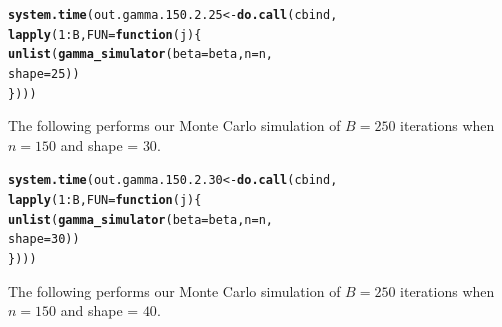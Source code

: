 \documentclass[11pt]{article}\usepackage[]{graphicx}\usepackage[]{color}
\makeatletter
\newcommand{\hlnum}[1]{\textcolor[rgb]{0.686,0.059,0.569}{#1}}%
\newcommand{\hlopt}[1]{\textcolor[rgb]{0,0,0}{#1}}%
\newcommand{\hlstd}[1]{\textcolor[rgb]{0.345,0.345,0.345}{#1}}%
\newcommand{\hlkwa}[1]{\textcolor[rgb]{0.161,0.373,0.58}{\textbf{#1}}}%
\newcommand{\hlkwb}[1]{\textcolor[rgb]{0.69,0.353,0.396}{#1}}%
\newcommand{\hlkwc}[1]{\textcolor[rgb]{0.333,0.667,0.333}{#1}}%
\newcommand{\hlkwd}[1]{\textcolor[rgb]{0.737,0.353,0.396}{\textbf{#1}}}%
\newenvironment{kframe}{%
 \def\at@end@of@kframe{}%
 \ifinner\ifhmode%
  \def\at@end@of@kframe{\end{minipage}}%
  \begin{minipage}{\columnwidth}%
 \fi\fi%
 \def\FrameCommand##1{\hskip\@totalleftmargin \hskip-\fboxsep
 \colorbox{shadecolor}{##1}\hskip-\fboxsep
     \hskip-\linewidth \hskip-\@totalleftmargin \hskip\columnwidth}%
 \MakeFramed {\advance\hsize-\width
   \@totalleftmargin\z@ \linewidth\hsize
   \@setminipage}}%
 {\par\unskip\endMakeFramed%
 \at@end@of@kframe}
\newenvironment{knitrout}{}{} %
\makeatother
\begin{document}
\begin{knitrout}
\color{fgcolor}\begin{kframe}
\begin{alltt}
\hlkwd{system.time}\hlstd{(out.gamma.150.2.25} \hlkwb{<-} \hlkwd{do.call}\hlstd{(cbind,}
  \hlkwd{lapply}\hlstd{(}\hlnum{1}\hlopt{:}\hlstd{B,} \hlkwc{FUN} \hlstd{=} \hlkwa{function}\hlstd{(}\hlkwc{j}\hlstd{)\{}
    \hlkwd{unlist}\hlstd{(}\hlkwd{gamma_simulator}\hlstd{(}\hlkwc{beta} \hlstd{= beta,} \hlkwc{n} \hlstd{= n,}
      \hlkwc{shape} \hlstd{=} \hlnum{25}\hlstd{))}
\hlstd{\})))}
\end{alltt}


{\ttfamily\noindent\bfseries\color{errorcolor}{\#\# Error in r[, l]/mad.predict.fun(out.mad, xx): non-numeric argument to binary operator}}

{\ttfamily\noindent\itshape\color{messagecolor}{\#\# Timing stopped at: 1.815 0.001 1.816}}\end{kframe}
\end{knitrout}


The following performs our Monte Carlo simulation of $B = 250$ iterations 
when $n = 150$ and shape = $30$.

\begin{knitrout}
\color{fgcolor}\begin{kframe}
\begin{alltt}
\hlkwd{system.time}\hlstd{(out.gamma.150.2.30} \hlkwb{<-} \hlkwd{do.call}\hlstd{(cbind,}
  \hlkwd{lapply}\hlstd{(}\hlnum{1}\hlopt{:}\hlstd{B,} \hlkwc{FUN} \hlstd{=} \hlkwa{function}\hlstd{(}\hlkwc{j}\hlstd{)\{}
    \hlkwd{unlist}\hlstd{(}\hlkwd{gamma_simulator}\hlstd{(}\hlkwc{beta} \hlstd{= beta,} \hlkwc{n} \hlstd{= n,}
      \hlkwc{shape} \hlstd{=} \hlnum{30}\hlstd{))}
\hlstd{\})))}
\end{alltt}


{\ttfamily\noindent\bfseries\color{errorcolor}{\#\# Error in r[, l]/mad.predict.fun(out.mad, xx): non-numeric argument to binary operator}}

{\ttfamily\noindent\itshape\color{messagecolor}{\#\# Timing stopped at: 1.884 0 1.884}}\end{kframe}
\end{knitrout}


The following performs our Monte Carlo simulation of $B = 250$ iterations 
when $n = 150$ and shape = $40$.
\end{document}

